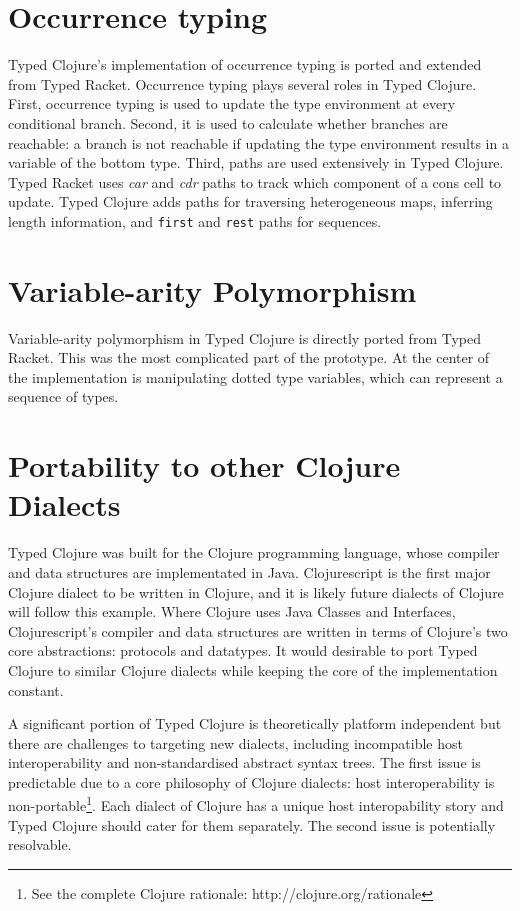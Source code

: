 % 

\section{Occurrence typing}

Typed Clojure's implementation of occurrence typing is ported and extended from Typed Racket.
Occurrence typing plays several roles in Typed Clojure.
First, occurrence typing is used to update the type environment at every conditional branch.
Second, it is used to calculate whether branches are reachable: a branch is not reachable
if updating the type environment results in a variable of the bottom type.
Third, paths are used extensively in Typed Clojure. Typed Racket uses \emph{car} and \emph{cdr} paths
to track which component of a cons cell to update. Typed Clojure adds paths for traversing heterogeneous maps,
inferring length information, and \lstinline|first| and \lstinline|rest| paths for sequences.

\section{Variable-arity Polymorphism}

Variable-arity polymorphism in Typed Clojure is directly ported from Typed Racket.
This was the most complicated part of the prototype. At the center of the implementation
is manipulating dotted type variables, which can represent a sequence of types.

\section{Portability to other Clojure Dialects}

Typed Clojure was built for the Clojure programming language, whose compiler
and data structures are implementated in Java. Clojurescript is the first major Clojure dialect
to be written in Clojure, and it is likely future dialects of Clojure will follow this example. 
Where Clojure uses Java Classes and Interfaces, 
Clojurescript's compiler and data structures are written in terms of Clojure's
two core abstractions: protocols and datatypes.
It would desirable to port Typed Clojure to similar  Clojure dialects while keeping
the core of the implementation constant.

A significant portion of Typed Clojure is theoretically platform independent but there are
challenges to targeting new dialects, including incompatible host interoperability and
non-standardised abstract syntax trees.
The first issue is predictable due to a core philosophy of Clojure dialects: 
host interoperability is non-portable\footnote{See the complete Clojure rationale: http://clojure.org/rationale}.
Each dialect of Clojure has a unique host interopability story and Typed Clojure should cater for them
separately.
The second issue is potentially resolvable. 

